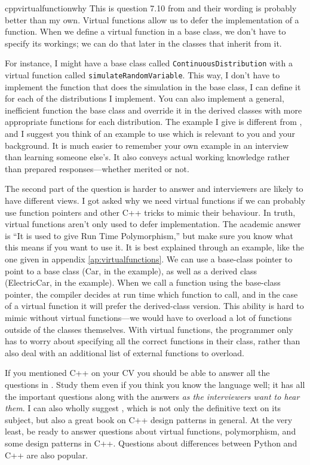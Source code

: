 \begin{answer}{cppvirtualfunctionwhy}
This is question 7.10 from \citet{JoshiQA}
and their wording is probably better than my own.
Virtual functions allow us to defer the implementation of a function.
When we define a virtual function in a base class, we don't have to specify its workings; we can do that later in the classes that inherit from it.

For instance, I might have a base class called \verb+ContinuousDistribution+ with a virtual function  called \verb+simulateRandomVariable+.
This way, I don't have to implement the function that does the simulation in the base class, I can define it for each of the distributions I implement.
You can also implement a general, inefficient function the base class and override it in the derived classes with more appropriate functions for each distribution.
The example I give is different from
\citet[question 7.10]{JoshiQA},
and I suggest you think of an example to use which is relevant to you and your background.
It is much easier to remember your own example in an interview than learning someone else's.
It also conveys actual working knowledge rather than prepared responses---whether merited or not.


The second part of the question is harder to answer and interviewers are likely to have different views.
I got asked why we need virtual functions if we can probably use function pointers and other C++ tricks to mimic their behaviour.
In truth, virtual functions aren't only used to defer implementation.
The academic answer is ``It is used to give Run Time Polymorphism,'' but  make sure you know what this means if you want to use it.
It is best explained through an example, like the one given in appendix \ref{ap:virtualfunctions}.
We can use a base-class pointer to point to a base class (Car, in the example), as well as a derived class (ElectricCar, in the example).
When we call a function using the base-class pointer, the compiler decides at run time which function to call, and in the case of a virtual function it will prefer the derived-class version.
This ability is hard to mimic without virtual functions---we would have to overload a lot of  functions outside of the classes themselves.
With virtual functions, the programmer only has to worry about specifying all the correct functions in their class, rather than also deal with an additional list of external functions to overload.

If you mentioned C++ on your CV you should be able to answer all the questions in
\citet[chap.~7]{JoshiQA}.
Study them even if you think you know the language well; it has all the important questions along with the answers \emph{as the interviewers want to hear them}.
I can also wholly suggest \citet{joshi2008cpp}, which is not only the definitive text on its subject, but also a great book on C++ design patterns in general.
At the very least, be ready to answer questions about virtual functions, polymorphism, and some design patterns in C++.
Questions about differences between Python and C++ are also popular.
\end{answer}
